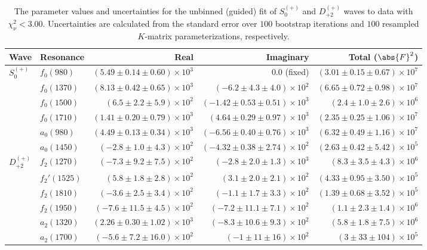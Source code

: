 \begin{table}[ht]
    \begin{center}
        \begin{tabular}{llrrr}\toprule
        Wave & Resonance & Real & Imaginary & Total ($\abs{F}^2$) \\\midrule
$S_{0}^{(+)}$ & $f_{0}(980)$ & $(5.49 \pm 0.14 \pm 0.60) \times 10^{3}$ & $0.0$ (fixed) & $(3.01 \pm 0.15 \pm 0.67) \times 10^{7}$ \\
 & $f_{0}(1370)$ & $(8.13 \pm 0.42 \pm 0.65) \times 10^{3}$ & $(-6.2 \pm 4.3 \pm 4.0) \times 10^{2}$ & $(6.65 \pm 0.72 \pm 0.98) \times 10^{7}$ \\
 & $f_{0}(1500)$ & $(6.5 \pm 2.2 \pm 5.9) \times 10^{2}$ & $(-1.42 \pm 0.53 \pm 0.51) \times 10^{3}$ & $(2.4 \pm 1.0 \pm 2.6) \times 10^{6}$ \\
 & $f_{0}(1710)$ & $(1.41 \pm 0.20 \pm 0.79) \times 10^{3}$ & $(4.64 \pm 0.29 \pm 0.97) \times 10^{3}$ & $(2.35 \pm 0.25 \pm 1.06) \times 10^{7}$ \\
 & $a_{0}(980)$ & $(4.49 \pm 0.13 \pm 0.34) \times 10^{3}$ & $(-6.56 \pm 0.40 \pm 0.76) \times 10^{3}$ & $(6.32 \pm 0.49 \pm 1.16) \times 10^{7}$ \\
 & $a_{0}(1450)$ & $(-2.8 \pm 1.0 \pm 4.3) \times 10^{2}$ & $(-4.32 \pm 0.38 \pm 2.74) \times 10^{2}$ & $(2.63 \pm 0.42 \pm 5.42) \times 10^{5}$ \\
$D_{+2}^{(+)}$ & $f_{2}(1270)$ & $(-7.3 \pm 9.2 \pm 7.5) \times 10^{2}$ & $(-2.8 \pm 2.0 \pm 1.3) \times 10^{3}$ & $(8.3 \pm 3.5 \pm 4.3) \times 10^{6}$ \\
 & $f_{2}'(1525)$ & $(5.8 \pm 1.8 \pm 2.8) \times 10^{2}$ & $(3.1 \pm 2.0 \pm 2.1) \times 10^{2}$ & $(4.33 \pm 0.95 \pm 3.50) \times 10^{5}$ \\
 & $f_{2}(1810)$ & $(-3.6 \pm 2.5 \pm 3.4) \times 10^{2}$ & $(-1.1 \pm 1.7 \pm 3.3) \times 10^{2}$ & $(1.39 \pm 0.68 \pm 3.52) \times 10^{5}$ \\
 & $f_{2}(1950)$ & $(-7.6 \pm 11.5 \pm 4.5) \times 10^{2}$ & $(-7.2 \pm 11.1 \pm 7.1) \times 10^{2}$ & $(1.1 \pm 2.3 \pm 1.4) \times 10^{6}$ \\
 & $a_{2}(1320)$ & $(2.26 \pm 0.30 \pm 1.02) \times 10^{3}$ & $(-8.3 \pm 10.6 \pm 9.3) \times 10^{2}$ & $(5.8 \pm 1.8 \pm 7.5) \times 10^{6}$ \\
 & $a_{2}(1700)$ & $(-5.6 \pm 7.2 \pm 16.0) \times 10^{2}$ & $(-1 \pm 11 \pm 16) \times 10^{2}$ & $(3 \pm 33 \pm 104) \times 10^{5}$ \\\bottomrule
        \end{tabular}
    \caption{The parameter values and uncertainties for the unbinned (guided) fit of $S_{0}^{(+)}$ and $D_{+2}^{(+)}$ waves to data with $\chi^2_\nu < 3.00$. Uncertainties are calculated from the standard error over $100$ bootstrap iterations and $100$ resampled $K$-matrix parameterizations, respectively.}\label{tab:unbinned-fit-chisqdof-3.0-guided-resampled-Sp0p-Dp2p}
    \end{center}
\end{table}
